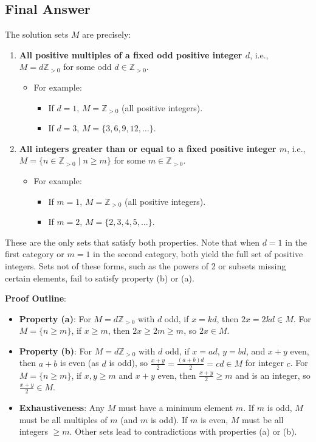 \documentclass[12pt,a4paper]{article}
\theoremstyle{definition}
\begin{document}
    \subsection*{Final Answer}
    The solution sets $M$ are precisely:
    \begin{enumerate}
        \item \textbf{All positive multiples of a fixed odd positive integer $d$}, i.e., $M = d\mathbb{Z}_{>0}$ for some odd $d \in \mathbb{Z}_{>0}$.
        \begin{itemize}
            \item For example:
            \begin{itemize}
                \item If $d = 1$, $M = \mathbb{Z}_{>0}$ (all positive integers).
                \item If $d = 3$, $M = \{3, 6, 9, 12, \ldots\}$.
            \end{itemize}
        \end{itemize}
        \item \textbf{All integers greater than or equal to a fixed positive integer $m$}, i.e., $M = \{n \in \mathbb{Z}_{>0} \mid n \geq m\}$ for some $m \in \mathbb{Z}_{>0}$.
        \begin{itemize}
            \item For example:
            \begin{itemize}
                \item If $m = 1$, $M = \mathbb{Z}_{>0}$ (all positive integers).
                \item If $m = 2$, $M = \{2, 3, 4, 5, \ldots\}$.
            \end{itemize}
        \end{itemize}
    \end{enumerate}

    These are the only sets that satisfy both properties. Note that when $d = 1$ in the first category or $m = 1$ in the second category, both yield the full set of positive integers. Sets not of these forms, such as the powers of 2 or subsets missing certain elements, fail to satisfy property (b) or (a).

    \textbf{Proof Outline}:
    \begin{itemize}
        \item \textbf{Property (a)}: For $M = d\mathbb{Z}_{>0}$ with $d$ odd, if $x = kd$, then $2x = 2kd \in M$. For $M = \{n \geq m\}$, if $x \geq m$, then $2x \geq 2m \geq m$, so $2x \in M$.
        \item \textbf{Property (b)}: For $M = d\mathbb{Z}_{>0}$ with $d$ odd, if $x = ad$, $y = bd$, and $x+y$ even, then $a + b$ is even (as $d$ is odd), so $\frac{x+y}{2} = \frac{(a+b)d}{2} = cd \in M$ for integer $c$. For $M = \{n \geq m\}$, if $x, y \geq m$ and $x+y$ even, then $\frac{x+y}{2} \geq m$ and is an integer, so $\frac{x+y}{2} \in M$.
        \item \textbf{Exhaustiveness}: Any $M$ must have a minimum element $m$. If $m$ is odd, $M$ must be all multiples of $m$ (and $m$ is odd). If $m$ is even, $M$ must be all integers $\geq m$. Other sets lead to contradictions with properties (a) or (b).
    \end{itemize}
\end{document}
